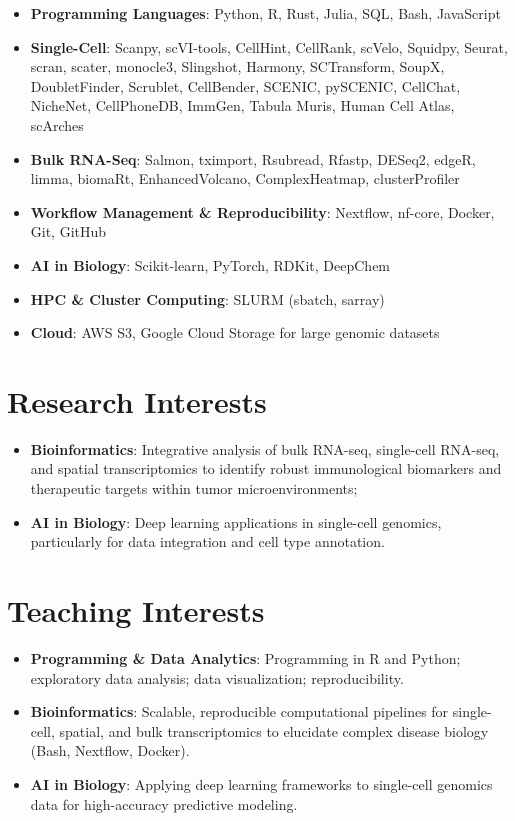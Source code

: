 \documentclass[
  11pt,
  letterpaper,
  DIV=11,
  numbers=noendperiod]{scrartcl}
\providecommand{\tightlist}{%
  \setlength{\itemsep}{0pt}\setlength{\parskip}{0pt}}
\begin{document}
\begin{itemize}
\tightlist
\item
  \textbf{Programming Languages}: Python, R, Rust, Julia, SQL, Bash,
  JavaScript
\item
  \textbf{Single-Cell}: Scanpy, scVI-tools, CellHint, CellRank, scVelo,
  Squidpy, Seurat, scran, scater, monocle3, Slingshot, Harmony,
  SCTransform, SoupX, DoubletFinder, Scrublet, CellBender, SCENIC,
  pySCENIC, CellChat, NicheNet, CellPhoneDB, ImmGen, Tabula Muris, Human
  Cell Atlas, scArches
\item
  \textbf{Bulk RNA-Seq}: Salmon, tximport, Rsubread, Rfastp, DESeq2,
  edgeR, limma, biomaRt, EnhancedVolcano, ComplexHeatmap,
  clusterProfiler
\item
  \textbf{Workflow Management \& Reproducibility}: Nextflow, nf-core,
  Docker, Git, GitHub
\item
  \textbf{AI in Biology}: Scikit-learn, PyTorch, RDKit, DeepChem
\item
  \textbf{HPC \& Cluster Computing}: SLURM (sbatch, sarray)
\item
  \textbf{Cloud}: AWS S3, Google Cloud Storage for large genomic
  datasets
\end{itemize}

\section{Research Interests}\label{research-interests}

\begin{itemize}
\item
  \textbf{Bioinformatics}: Integrative analysis of bulk RNA-seq,
  single-cell RNA-seq, and spatial transcriptomics to identify robust
  immunological biomarkers and therapeutic targets within tumor
  microenvironments;
\item
  \textbf{AI in Biology}: Deep learning applications in single-cell
  genomics, particularly for data integration and cell type annotation.
\end{itemize}

\vspace{-15pt}

\section{Teaching Interests}\label{teaching-interests}

\begin{itemize}
\tightlist
\item
  \textbf{Programming \& Data Analytics}: Programming in R and Python;
  exploratory data analysis; data visualization; reproducibility.
\item
  \textbf{Bioinformatics}: Scalable, reproducible computational
  pipelines for single-cell, spatial, and bulk transcriptomics to
  elucidate complex disease biology (Bash, Nextflow, Docker).\\
\item
  \textbf{AI in Biology}: Applying deep learning frameworks to
  single-cell genomics data for high-accuracy predictive modeling.
\end{itemize}
\end{document}
